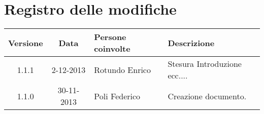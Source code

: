 \section*{Registro delle modifiche}

\begin{tabularx}{\textwidth}{|c|c|p{3.5cm}|X|}
 \hline \textbf{Versione} & \textbf{Data} & \textbf{Persone coinvolte} & \textbf{Descrizione} \\
 \hline 1.1.1 & 2-12-2013 & Rotundo Enrico & Stesura Introduzione ecc....\\
 \hline 1.1.0 & 30-11-2013 & Poli Federico & Creazione documento.\\
 \hline
\end{tabularx}
